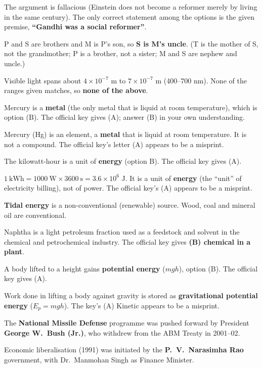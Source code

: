 The argument is fallacious (Einstein does not become a reformer merely by living in the same century). The only correct statement among the options is the given premise, \textbf{``Gandhi was a social reformer''}.

P and S are brothers and M is P's son, so \textbf{S is M's uncle}. (T is the mother of S, not the grandmother; P is a brother, not a sister; M and S are nephew and uncle.)

Visible light spans about $4\times10^{-7}$ m to $7\times10^{-7}$ m (400--700 nm). None of the ranges given matches, so \textbf{none of the above}.

Mercury is a \textbf{metal} (the only metal that is liquid at room temperature), which is option (B). The official key gives (A); answer (B) in your own understanding.

Mercury (Hg) is an element, a \textbf{metal} that is liquid at room temperature. It is not a compound. The official key's letter (A) appears to be a misprint.

The kilowatt-hour is a unit of \textbf{energy} (option B). The official key gives (A).

$1\ \text{kWh}=1000\ \text{W}\times3600\ \text{s}=3.6\times10^6$ J. It is a unit of \textbf{energy} (the ``unit'' of electricity billing), not of power. The official key's (A) appears to be a misprint.

\textbf{Tidal energy} is a non-conventional (renewable) source. Wood, coal and mineral oil are conventional.

Naphtha is a light petroleum fraction used as a feedstock and solvent in the chemical and petrochemical industry. The official key gives \textbf{(B) chemical in a plant}.

A body lifted to a height gains \textbf{potential energy} ($mgh$), option (B). The official key gives (A).

Work done in lifting a body against gravity is stored as \textbf{gravitational potential energy} ($E_p=mgh$). The key's (A) Kinetic appears to be a misprint.

The \textbf{National Missile Defense} programme was pushed forward by President \textbf{George W.~Bush (Jr.)}, who withdrew from the ABM Treaty in 2001--02.

Economic liberalisation (1991) was initiated by the \textbf{P.~V.~Narasimha Rao} government, with Dr.~Manmohan Singh as Finance Minister.

